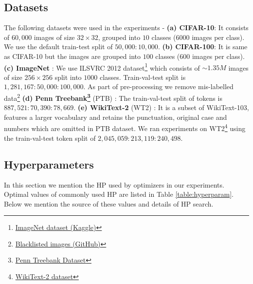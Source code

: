 \subsection{Datasets}
The following datasets were used in the experiments - \textbf{(a) CIFAR-10}: It consists of $60,000$ images of size $32\times32$, grouped into $10$ classes ($6000$ images per class). We use the default train-test split of $50,000:10,000$. \textbf{(b) CIFAR-100}: It is same as CIFAR-10 but the images are grouped into $100$ classes ($600$ images per class).
\textbf{(c) ImageNet} \cite{Imagenet}: We use ILSVRC 2012 dataset\footnote{\href{https://www.kaggle.com/c/imagenet-object-localization-challenge/data}{ImageNet dataset (Kaggle)}} which consists of $\sim 1.35M$ images of size $256 \times 256$ split into $1000$ classes. Train-val-test split is  $1,281,167:50,000:100,000$. As part of pre-processing we remove mis-labelled data\footnote{\href{https://github.com/fastai/imagenet-fast/blob/master/imagenet\_nv/blacklist.sh}{Blacklisted images (GitHub)}} \textbf{(d) Penn Treebank\footnote{\href{http://www.fit.vutbr.cz/\~imikolov/rnnlm/simple-examples.tgz}{Penn Treebank Dataset}}} (PTB) \cite{PTB}: The train-val-test split of tokens is $887,521:70,390:78,669$. \textbf{(e) WikiText-2} (WT2) \cite{WikiText_2}: It is a subset of WikiText-103, features a larger vocabulary and retains the punctuation, original case and numbers which are omitted in PTB dataset. We ran experiments on WT2\footnote{\href{https://s3.amazonaws.com/research.metamind.io/wikitext/wikitext-2-v1.zip}{WikiText-2 dataset}} using the train-val-test token split of $2,045,059:213,119:240,498$. 


\subsection{Hyperparameters}
In this section we mention the HP used by optimizers in our experiments. Optimal values of commonly used HP are listed in Table \ref{table:hyperparam}. Below we mention the source of these values and details of HP search. 

